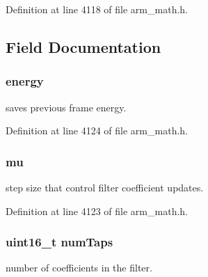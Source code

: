 Definition at line 4118 of file arm\+\_\+math.\+h.



\subsection{Field Documentation}
\subsubsection[{\texorpdfstring{energy}{energy}}]{ energy}\hypertarget{structarm__lms__norm__instance__f32_ae1ed544b72f1510ed55d144a9424fddd}{}\label{structarm__lms__norm__instance__f32_ae1ed544b72f1510ed55d144a9424fddd}
saves previous frame energy. 

Definition at line 4124 of file arm\+\_\+math.\+h.

\subsubsection[{\texorpdfstring{mu}{mu}}]{ mu}\hypertarget{structarm__lms__norm__instance__f32_a11402afa7c9b9dac4cb953fa386e74d2}{}\label{structarm__lms__norm__instance__f32_a11402afa7c9b9dac4cb953fa386e74d2}
step size that control filter coefficient updates. 

Definition at line 4123 of file arm\+\_\+math.\+h.

\subsubsection[{\texorpdfstring{num\+Taps}{numTaps}}]{\setlength{\rightskip}{0pt plus 5cm}uint16\+\_\+t num\+Taps}\hypertarget{structarm__lms__norm__instance__f32_a751941891e47f522a7f5375fe8990aac}{}\label{structarm__lms__norm__instance__f32_a751941891e47f522a7f5375fe8990aac}
number of coefficients in the filter. 

